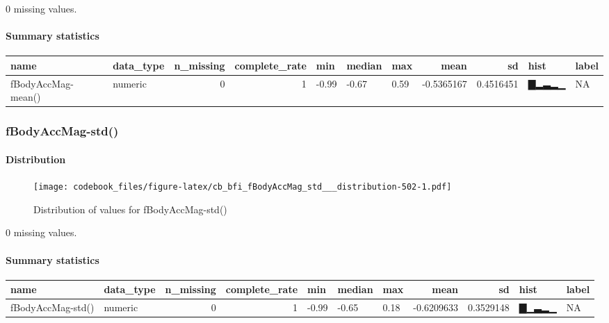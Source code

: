 \documentclass[
]{article}
\begin{document}
0 missing values.

\hypertarget{fBodyAccMag_mean___summary}{%
\paragraph{Summary statistics}\label{fBodyAccMag_mean___summary}}

\begin{longtable}[]{@{}llrrlllrrll@{}}
\toprule
name & data\_type & n\_missing & complete\_rate & min & median & max &
mean & sd & hist & label \\
\midrule
\endhead
fBodyAccMag-mean() & numeric & 0 & 1 & -0.99 & -0.67 & 0.59 & -0.5365167
& 0.4516451 & ▇▂▃▂▁ & NA \\
\bottomrule
\end{longtable}

\hypertarget{fBodyAccMag_std__}{%
\subsubsection{fBodyAccMag-std()}\label{fBodyAccMag_std__}}

\hypertarget{fBodyAccMag_std___distribution}{%
\paragraph{Distribution}\label{fBodyAccMag_std___distribution}}

\begin{figure}
\centering
\texttt{[image: codebook\_files/figure-latex/cb\_bfi\_fBodyAccMag\_std\_\_\_distribution-502-1.pdf]}
\caption{Distribution of values for fBodyAccMag-std()}
\end{figure}

0 missing values.

\hypertarget{fBodyAccMag_std___summary}{%
\paragraph{Summary statistics}\label{fBodyAccMag_std___summary}}

\begin{longtable}[]{@{}llrrlllrrll@{}}
\toprule
name & data\_type & n\_missing & complete\_rate & min & median & max &
mean & sd & hist & label \\
\midrule
\endhead
fBodyAccMag-std() & numeric & 0 & 1 & -0.99 & -0.65 & 0.18 & -0.6209633
& 0.3529148 & ▇▁▃▂▁ & NA \\
\bottomrule
\end{longtable}
\end{document}
